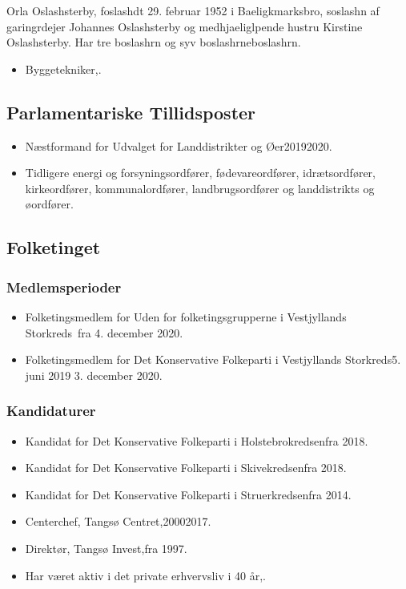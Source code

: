 \documentclass[11pt, a4paper]{awesome-cv}
\begin{document}
\makecvheader[R]
\makelettertitle
\begin{cvletter}
Orla Oslashsterby, foslashdt 29. februar 1952 i Baeligkmarksbro, soslashn af garingrdejer Johannes Oslashsterby og medhjaeliglpende hustru Kirstine Oslashsterby. Har tre boslashrn og syv boslashrneboslashrn.

\begin{itemize}
\item Byggetekniker,.
\end{itemize}
\subsection*{Parlamentariske Tillidsposter}
\begin{itemize}
\item Næstformand for Udvalget for Landdistrikter og Øer20192020.
\item Tidligere energi og forsyningsordfører, fødevareordfører, idrætsordfører, kirkeordfører, kommunalordfører, landbrugsordfører og landdistrikts og øordfører.
\end{itemize}
\subsection*{Folketinget}
\subsubsection*{Medlemsperioder}
\begin{itemize}
\item Folketingsmedlem for Uden for folketingsgrupperne i Vestjyllands Storkreds fra 4. december 2020.
\item Folketingsmedlem for Det Konservative Folkeparti i Vestjyllands Storkreds5. juni 2019  3. december 2020.
\end{itemize}
\subsubsection*{Kandidaturer}
\begin{itemize}
\item Kandidat for Det Konservative Folkeparti i Holstebrokredsenfra 2018.
\item Kandidat for Det Konservative Folkeparti i Skivekredsenfra 2018.
\item Kandidat for Det Konservative Folkeparti i Struerkredsenfra 2014.
\end{itemize}
\begin{itemize}
\item Centerchef, Tangsø Centret,20002017.
\item Direktør, Tangsø Invest,fra 1997.
\item Har været aktiv i det private erhvervsliv i 40 år,.
\end{itemize}
\end{cvletter}
\end{document}
